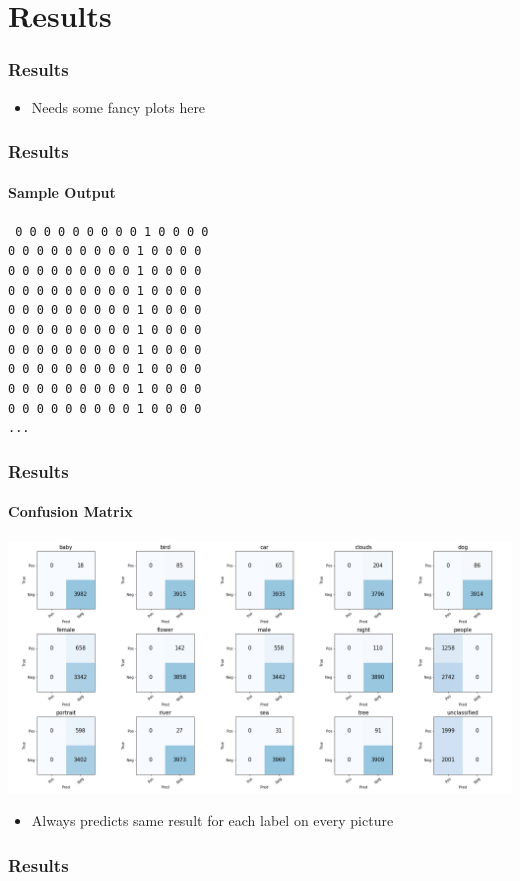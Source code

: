 \newcommand{\overtitle}{Results}
\section{Results}

\begin{frame}
	\frametitle{\overtitle}
	\begin{itemize}
		\item Needs some fancy plots here
	\end{itemize}
\end{frame}

\begin{frame}
	\frametitle{\overtitle}
	\framesubtitle{Sample Output}
	\begin{centering}
	\texttt{%
		0 0 0 0 0 0 0 0 0 1 0 0 0 0 \\
		0 0 0 0 0 0 0 0 0 1 0 0 0 0 \\
		0 0 0 0 0 0 0 0 0 1 0 0 0 0 \\
		0 0 0 0 0 0 0 0 0 1 0 0 0 0 \\
		0 0 0 0 0 0 0 0 0 1 0 0 0 0 \\
		0 0 0 0 0 0 0 0 0 1 0 0 0 0 \\
		0 0 0 0 0 0 0 0 0 1 0 0 0 0 \\
		0 0 0 0 0 0 0 0 0 1 0 0 0 0 \\
		0 0 0 0 0 0 0 0 0 1 0 0 0 0 \\
		0 0 0 0 0 0 0 0 0 1 0 0 0 0 \\
		...
		}
	\end{centering}
\end{frame}

\begin{frame}
	\frametitle{\overtitle}
	\framesubtitle{Confusion Matrix}
	\includegraphics[width=\textwidth]{images/final_model_confusion.png}
	\begin{itemize}
		\item Always predicts same result for each label on every picture
	\end{itemize}
\end{frame}

\begin{frame}
	\frametitle{\overtitle}
\end{frame}

